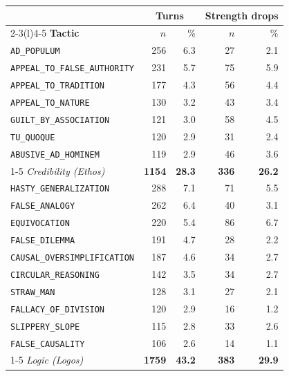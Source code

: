 \begin{table}[t]
\centering\small
\begin{tabular}{@{}lrrrr@{}}
\toprule
& \multicolumn{2}{c}{\textbf{Turns}} & \multicolumn{2}{c}{\textbf{Strength drops}} \\
\cmidrule(lr){2-3}\cmidrule(l){4-5}
\textbf{Tactic} & $n$ & \% & $n$ & \% \\
\midrule
\quad \texttt{\scriptsize AD\_POPULUM} & 256 & 6.3 & 27 & 2.1 \\
\quad \texttt{\scriptsize APPEAL\_TO\_FALSE\_AUTHORITY} & 231 & 5.7 & 75 & 5.9 \\
\quad \texttt{\scriptsize APPEAL\_TO\_TRADITION} & 177 & 4.3 & 56 & 4.4 \\
\quad \texttt{\scriptsize APPEAL\_TO\_NATURE} & 130 & 3.2 & 43 & 3.4 \\
\quad \texttt{\scriptsize GUILT\_BY\_ASSOCIATION} & 121 & 3.0 & 58 & 4.5 \\
\quad \texttt{\scriptsize TU\_QUOQUE} & 120 & 2.9 & 31 & 2.4 \\
\quad \texttt{\scriptsize ABUSIVE\_AD\_HOMINEM} & 119 & 2.9 & 46 & 3.6 \\
\cmidrule(l){1-5}
\emph{Credibility (Ethos)} & \textbf{1154} & \textbf{28.3} & \textbf{336} & \textbf{26.2} \\
\midrule
\quad \texttt{\scriptsize HASTY\_GENERALIZATION} & 288 & 7.1 & 71 & 5.5 \\
\quad \texttt{\scriptsize FALSE\_ANALOGY} & 262 & 6.4 & 40 & 3.1 \\
\quad \texttt{\scriptsize EQUIVOCATION} & 220 & 5.4 & 86 & 6.7 \\
\quad \texttt{\scriptsize FALSE\_DILEMMA} & 191 & 4.7 & 28 & 2.2 \\
\quad \texttt{\scriptsize CAUSAL\_OVERSIMPLIFICATION} & 187 & 4.6 & 34 & 2.7 \\
\quad \texttt{\scriptsize CIRCULAR\_REASONING} & 142 & 3.5 & 34 & 2.7 \\
\quad \texttt{\scriptsize STRAW\_MAN} & 128 & 3.1 & 27 & 2.1 \\
\quad \texttt{\scriptsize FALLACY\_OF\_DIVISION} & 120 & 2.9 & 16 & 1.2 \\
\quad \texttt{\scriptsize SLIPPERY\_SLOPE} & 115 & 2.8 & 33 & 2.6 \\
\quad \texttt{\scriptsize FALSE\_CAUSALITY} & 106 & 2.6 & 14 & 1.1 \\
\cmidrule(l){1-5}
\emph{Logic (Logos)} & \textbf{1759} & \textbf{43.2} & \textbf{383} & \textbf{29.9} \\

\end{tabular}
\end{table}
